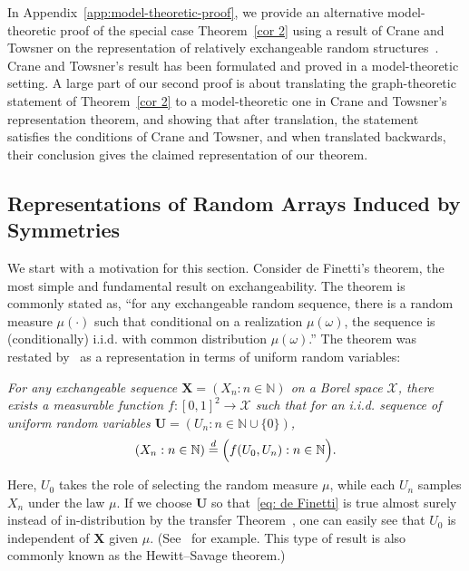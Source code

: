 \documentclass[AHL,Unicode,longabstracts,published]{cedram}
\renewcommand{\d}{\buildrel{d}\over{=}}
\newcommand*\N{\mathbb{N}}
\newcommand*\XX{{\mathcal{X}}}
\newcommand*\bU{\mathbf{U}}
\newcommand*\bX{\mathbf{X}}
\newcommand*\N{\mathbb{N}}
\begin{document}
\begin{rema}
In Appendix~\ref{app:model-theoretic-proof}, we provide an alternative model-theoretic proof of the special case Theorem~\ref{cor 2} using a result of Crane and Towsner on the representation of relatively exchangeable random structures~\cite{crane2017relative}. Crane and Towsner's result has been formulated and proved in a model-theoretic setting. A large part of our second proof is about translating the graph-theoretic statement of Theorem~\ref{cor 2} to a model-theoretic one in Crane and Towsner's representation theorem, and showing that after translation, the statement satisfies the conditions of Crane and Towsner, and when translated backwards, their conclusion gives the claimed representation of our theorem.
\end{rema}


\subsection{Representations of Random Arrays Induced by Symmetries}\label{sec: symmetry rv S}
We start with a motivation for this section. Consider de Finetti's theorem, the most simple and fundamental result on exchangeability. The theorem is commonly stated as, ``for any exchangeable random sequence, there is a random measure $\mu(\cdot)$ such that conditional on a realization $\mu(\omega)$, the sequence is (conditionally) i.i.d. with common distribution $\mu(\omega)$.'' The theorem was restated by~\cite{aldous1981representations} as a representation in terms of uniform random variables:

\emph{For any exchangeable sequence $\bX = (X_n : n \in \N)$ on a Borel space $\XX$, there exists a measurable function $f:[0,1]^2 \to \XX$ such that for an i.i.d. sequence of uniform random variables $\bU=(U_n : n \in \N \cup \{0\})$,}
\begin{equation}\label{eq: de Finetti}
(X_n : n \in \N) \d \Big(f(U_0, U_n) : n \in \N \Big).
\end{equation}


Here, $U_0$ takes the role of selecting the random measure $\mu$, while each $U_n$ samples $X_n$ under the law $\mu$. If we choose $\bU$ so that~\eqref{eq: de Finetti} is true almost surely instead of in-distribution by the transfer Theorem~\cite[Theorem~6.10]{kallenberg2002foundations}, one can easily see that $U_0$ is independent of $\bX$ given $\mu$. (See~\cite[Lemma~7.1 and Theorem~1.1]{kallenberg2006probabilistic} for example. This type of result is also commonly known as the Hewitt--Savage theorem.)
\end{document}
